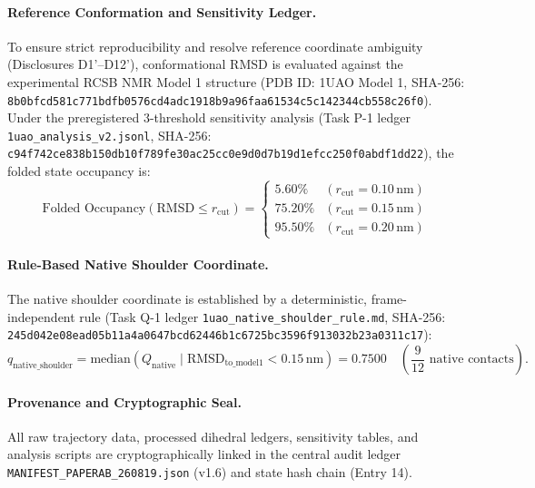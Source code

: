 \documentclass{article}
\begin{document}
\paragraph{Reference Conformation and Sensitivity Ledger.}
To ensure strict reproducibility and resolve reference coordinate ambiguity (Disclosures D1'--D12'), conformational RMSD is evaluated against the experimental RCSB NMR Model 1 structure (PDB ID: 1UAO Model 1, SHA-256: \texttt{8b0bfcd581c771bdfb0576cd4adc1918b9a96faa61534c5c142344cb558c26f0}). Under the preregistered 3-threshold sensitivity analysis (Task P-1 ledger \texttt{1uao\_analysis\_v2.jsonl}, SHA-256: \texttt{c94f742ce838b150db10f789fe30ac25cc0e9d0d7b19d1efcc250f0abdf1dd22}), the folded state occupancy is:
\begin{equation}
\text{Folded Occupancy}(\text{RMSD} \le r_{\text{cut}}) = 
\begin{cases} 
5.60\% & (r_{\text{cut}} = 0.10\,\text{nm}) \\
75.20\% & (r_{\text{cut}} = 0.15\,\text{nm}) \\
95.50\% & (r_{\text{cut}} = 0.20\,\text{nm})
\end{cases}
\end{equation}

\paragraph{Rule-Based Native Shoulder Coordinate.}
The native shoulder coordinate is established by a deterministic, frame-independent rule (Task Q-1 ledger \texttt{1uao\_native\_shoulder\_rule.md}, SHA-256: \texttt{245d042e08ead05b11a4a0647bcd62446b1c6725bc3596f913032b23a0311c17}):
\begin{equation}
q_{\text{native\_shoulder}} = \text{median}\left(Q_{\text{native}} \mid \text{RMSD}_{\text{to\_model1}} < 0.15\,\text{nm}\right) = \mathbf{0.7500} \quad \left(\frac{9}{12} \text{ native contacts}\right).
\end{equation}

\paragraph{Provenance and Cryptographic Seal.}
All raw trajectory data, processed dihedral ledgers, sensitivity tables, and analysis scripts are cryptographically linked in the central audit ledger \texttt{MANIFEST\_PAPERAB\_260819.json} (v1.6) and state hash chain (Entry 14).
\end{document}
